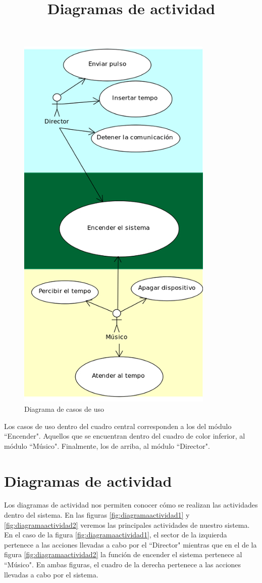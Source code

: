 \begin{figure}[!htb]
\centering
\includegraphics[]{./imagenes/diagramacasosdeuso}
\caption{Diagrama de casos de uso} \label{fig:diagramacasosdeuso}
\end{figure}

Los casos de uso dentro del cuadro central corresponden a los del módulo ``Encender".
Aquellos que se encuentran dentro del cuadro de color inferior, al módulo ``Músico". Finalmente,
los de arriba, al módulo ``Director".\\

\section{Diagramas de actividad}
\title{Diagramas de actividad}

Los diagramas de actividad nos permiten conocer cómo se realizan
las actividades dentro del sistema. En las figuras \ref{fig:diagramaactividad1} y \ref{fig:diagramaactividad2}
veremos las principales actividades de nuestro sistema. En el caso de la figura \ref{fig:diagramaactividad1},
el sector de la izquierda pertenece a las acciones llevadas a cabo por el ``Director" mientras que en el de la figura
\ref{fig:diagramaactividad2} la función de encender el sistema pertenece al ``Músico". En ambas
figuras, el cuadro de la derecha pertenece a las acciones llevadas a cabo por el sistema.\\


